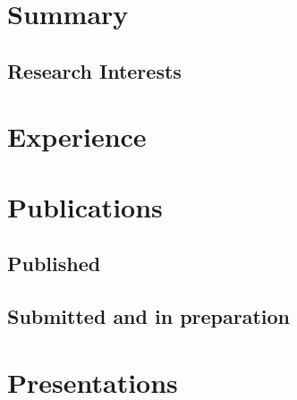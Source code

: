 \documentclass[letterpaper]{twentysecondcv} %
\begin{document}
\makeprofile %
 

\section{Summary}

\subsection{Research Interests}
\begin{itemize}
\end{itemize}

\section{Experience}

\begin{twenty} %
\end{twenty}


\begin{publications}
\section{Publications}
\subsection{Published}
\begin{itemize}
\end{itemize}

\subsection{Submitted and in preparation}
\begin{itemize}
\end{itemize}

\section{Presentations}
\begin{twentyfull}
\end{twentyfull}
\end{publications}
\end{document}
